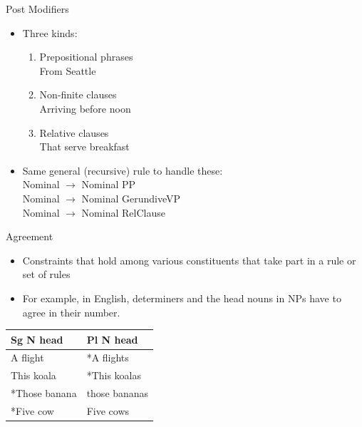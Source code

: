 \documentclass[9pt,xcolor=pdftex,dvipsnames,table]{beamer}
\begin{document}
\begin{frame}{Post Modifiers}

	\begin{itemize}
		\item Three kinds:

		\begin{enumerate}
			\item Prepositional phrases\\
			From Seattle
			\item Non-finite clauses\\
			Arriving before noon
			\item Relative clauses\\
			That serve breakfast
		\end{enumerate}
		\item Same general (recursive) rule to handle these:\\
		\vspace{.5cm}
			Nominal $\rightarrow$ Nominal PP\\
			Nominal $\rightarrow$ Nominal GerundiveVP\\
			Nominal $\rightarrow$ Nominal RelClause\\
	\end{itemize}
\end{frame}

\begin{frame}{Agreement}

	\begin{itemize}
		\item Constraints that hold among various constituents that take part in a rule or set of rules
		\item For example, in English, determiners and the head nouns in NPs have to agree in their number.
	\end{itemize}

\begin{center}
\begin{tabular}{ l l } \toprule
    Sg N head & Pl N head \\ \midrule
    A flight & *A flights \\
	This koala & *This koalas  \\
	*Those banana & those bananas \\
	*Five cow & Five cows\\
	\bottomrule
\end{tabular}
\end{center}

\end{frame}
\end{document}
